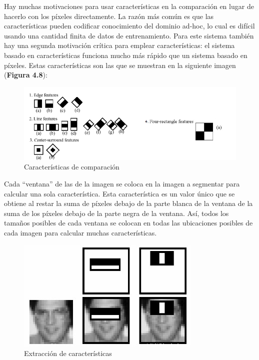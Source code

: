 Hay muchas motivaciones para usar características en la comparación en lugar de hacerlo con los píxeles directamente. La razón más común es que las características pueden codificar conocimiento del dominio ad-hoc, lo cual es difícil usando una cantidad finita de datos de entrenamiento. Para este sistema también hay una segunda motivación crítica para emplear características: el sistema basado en características funciona mucho más rápido que un sistema basado en píxeles. Estas características son las que se muestran en la siguiente imagen (\textbf{Figura 4.8}):

\begin{figure}[H]
  \begin{center}
    \includegraphics[width=0.99\linewidth]{figures/features.png}
		\caption{Características de comparación}
		\label{fig.features}
		\end{center}
\end{figure}

Cada “ventana” de las de la imagen se coloca en la imagen a segmentar para calcular una sola característica. Esta característica es un valor único que se obtiene al restar la suma de píxeles debajo de la parte blanca de la ventana de la suma de los píxeles debajo de la parte negra de la ventana. Así, todos los tamaños posibles de cada ventana se colocan en todas las ubicaciones posibles de cada imagen para calcular muchas características. 

\begin{figure}[H]
  \begin{center}
    \includegraphics[width=0.69\linewidth]{figures/extraction.jpg}
		\caption{Extracción de características}
		\label{fig.extraction}
		\end{center}
\end{figure}

